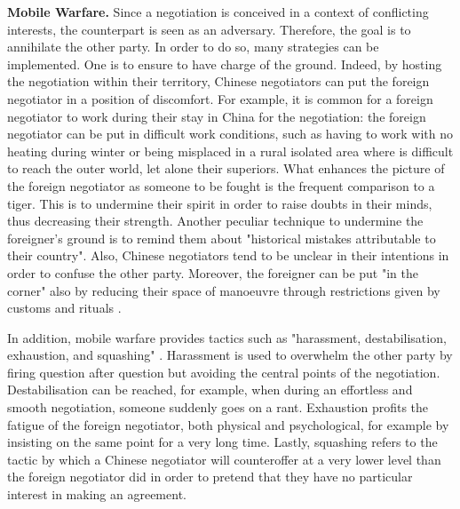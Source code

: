 \documentclass[../main.tex]{subfiles}
\begin{document}
\textbf{Mobile Warfare.} Since a negotiation is conceived in a context of conflicting interests, the counterpart is seen as an adversary. Therefore, the goal is to annihilate the other party. In order to do so, many strategies can be implemented. One is to ensure to have charge of the ground. Indeed, by hosting the negotiation within their territory, Chinese negotiators can put the foreign negotiator in a position of discomfort. For example, it is common for a foreign negotiator to work during their stay in China for the negotiation: the foreign negotiator can be put in difficult work conditions, such as having to work with no heating during winter or being misplaced in a rural isolated area where is difficult to reach the outer world, let alone their superiors.
What enhances the picture of the foreign negotiator as someone to be fought is the frequent comparison to a tiger. This is to undermine their spirit in order to raise doubts in their minds, thus decreasing their strength. Another peculiar technique to undermine the foreigner's ground is to remind them about "historical mistakes attributable to their country". Also, Chinese negotiators tend to be unclear in their intentions in order to confuse the other party. Moreover, the foreigner can be put "in the corner" also by reducing their space of manoeuvre through restrictions given by customs and rituals \autocite[41]{faure1}.

In addition, mobile warfare provides tactics such as "harassment, destabilisation, exhaustion, and squashing" \autocite[42]{faure1}.
Harassment is used to overwhelm the other party by firing question after question but avoiding the central points of the negotiation.
Destabilisation can be reached, for example, when during an effortless and smooth negotiation, someone suddenly goes on a rant.
Exhaustion profits the fatigue of the foreign negotiator, both physical and psychological, for example by insisting on the same point for a very long time.
Lastly, squashing refers to the tactic by which a Chinese negotiator will counteroffer at a very lower level than the foreign negotiator did in order to pretend that they have no particular interest in making an agreement.
\end{document}
